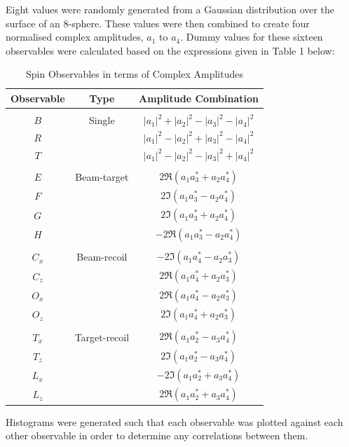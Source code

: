 \documentclass[a4paper,12pt]{article}
\begin{document}
\newline
Eight values were randomly generated from a Gaussian distribution over the surface of an 8-sphere.  These values were then combined to create four normalised complex amplitudes, $a_{1}$ to $a_{4}$.  Dummy values for these sixteen observables were calculated based on the expressions given in Table 1 below:
\newline
  \begin{center}
  \begin{table}[!h]
  \caption{Spin Observables in terms of Complex Amplitudes \cite{info}}
  \centering
  \begin{tabular}{c  c  c}
  \hline \hline
  Observable & Type & Amplitude Combination \\ [0.5ex]
  \hline \\
  $B$ & Single & $|a_{1}|^{2} + |a_{2}|^{2} - |a_{3}|^{2} - |a_{4}|^{2}$ \\
  $R$ & & $|a_{1}|^{2} - |a_{2}|^{2} + |a_{3}|^{2} - |a_{4}|^{2}$ \\
  $T$ & & $|a_{1}|^{2} - |a_{2}|^{2} - |a_{3}|^{2} + |a_{4}|^{2}$ \\ \\
  $E$ & Beam-target & $2\Re(a_{1}a_{3}^{*} + a_{2}a_{4}^{*})$ \\
  $F$ & & $2\Im(a_{1}a_{3}^{*} - a_{2}a_{4}^{*})$ \\ 
  $G$ & & $2\Im(a_{1}a_{3}^{*} + a_{2}a_{4}^{*})$ \\ 
  $H$ & & $-2\Re(a_{1}a_{3}^{*} - a_{2}a_{4}^{*})$ \\ \\
  $C_{x}$ & Beam-recoil & $-2\Im(a_{1}a_{4}^{*} - a_{2}a_{3}^{*})$ \\
  $C_{z}$ & & $2\Re(a_{1}a_{4}^{*} + a_{2}a_{3}^{*})$ \\
  $O_{x}$ & & $2\Re(a_{1}a_{4}^{*} - a_{2}a_{3}^{*})$ \\
  $O_{z}$ & & $2\Im(a_{1}a_{4}^{*} + a_{2}a_{3}^{*})$ \\ \\
  $T_{x}$ & Target-recoil & $2\Re(a_{1}a_{2}^{*} - a_{3}a_{4}^{*})$ \\
  $T_{z}$ & & $2\Im(a_{1}a_{2}^{*} - a_{3}a_{4}^{*})$ \\
  $L_{x}$ & & $-2\Im(a_{1}a_{2}^{*} + a_{3}a_{4}^{*})$ \\
  $L_{z}$ & & $2\Re(a_{1}a_{2}^{*} + a_{3}a_{4}^{*})$ \\ [1ex]
  \hline
  \end{tabular}

  \end{table}
  \end{center}
\newpage
Histograms were generated such that each observable was plotted against each other observable in order to determine any correlations between them.  
\end{document}

